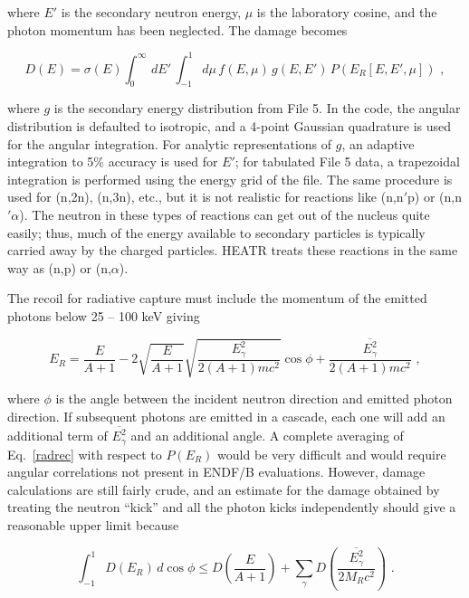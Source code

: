 \noindent
where $E'$ is the secondary neutron energy, $\mu$ is the
laboratory cosine, and the photon momentum has been neglected.
The damage becomes

\begin{equation}
   D(E)=\sigma(E)\int_0^\infty\,dE'\,\int_{-1}^1d\mu
     \, f(E,\mu)\,g(E,E')\,P(E_R[E,E',\mu])\,\,,
\label{f5dam}
\end{equation}

\noindent
where $g$ is the secondary energy distribution from File 5.
In the code, the angular distribution is defaulted to isotropic,
and a 4-point Gaussian quadrature is used for the angular
integration.  For analytic representations of $g$, an adaptive
integration to 5\% accuracy is used for $E'$; for tabulated
File 5 data, a trapezoidal integration is performed using the
energy grid of the file.  The same procedure is used for
(n,2n), (n,3n), etc., but it is not realistic for reactions
like (n,n$'$p) or (n,n$'\alpha$).  The neutron in these types of
reactions can get out of the nucleus quite easily; thus, much of
the energy available to secondary particles is typically carried
away by the charged particles\cite{alb}.  HEATR treats these
reactions in the same way as (n,p) or (n,$\alpha$).

The recoil for radiative capture must include the momentum of
the emitted photons below 25 -- 100 keV giving

\begin{equation}
   E_R=\frac{E}{A+1}-2\sqrt{\frac{E}{A+1}}
    \sqrt{\frac{E_\gamma^2}{2(A+1)mc^2}}\cos\phi
    +\frac{\overline{E_\gamma^2}}{2(A+1)mc^2}\,\,,
\label{radrec}
\end{equation}

\noindent
where $\phi$ is the angle between the incident neutron direction
and emitted photon direction.  If subsequent photons are emitted
in a cascade, each one will add an additional term of
$\overline{E_\gamma^2}$ and an additional angle.  A complete
averaging of Eq.~\ref{radrec} with respect to $P(E_R)$ would
be very difficult and would require angular correlations not
present in ENDF/B evaluations.  However, damage calculations are still
fairly crude, and an estimate for the damage obtained by
treating the neutron ``kick'' and all the photon kicks
independently should give a reasonable upper limit because

\begin{equation}
   \int_{-1}^1D(E_R)\,d\cos\phi\le
     D\left(\frac{E}{A+1}\right)+\sum_\gamma D\left(
      \frac{\overline{E_\gamma^2}}{2M_Rc^2}\right)\,\,.
\end{equation}


